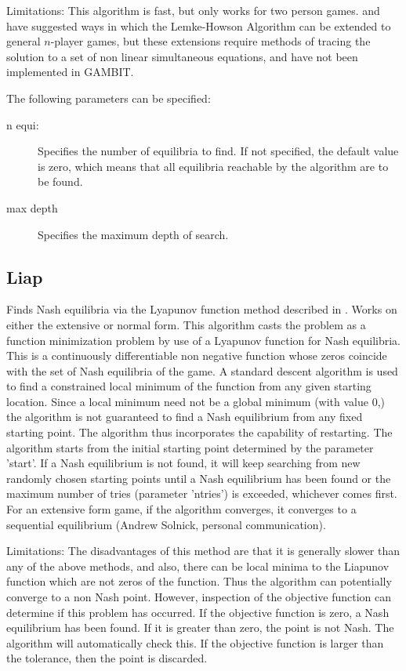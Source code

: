 Limitations:  This algorithm is fast, but only works for two
person games.  \cite{Wilson:1971} and \cite{Rosenmuller:1971} have
suggested ways in which the Lemke-Howson Algorithm can be extended to
general $n$-player games, but these extensions require methods of tracing
the solution to a set of non linear simultaneous equations, and have not
been implemented in GAMBIT.

The following parameters can be specified:

\begin{description}
\item[n equi:] Specifies the number of equilibria to find.  If not specified,
the default value is zero, which means that all equilibria reachable by
the algorithm are to be found.
\item[max depth]
Specifies the maximum depth of search.
\end{description}

\subsection{Liap}\label{Liap}
Finds Nash equilibria via the Lyapunov function method
described in \cite{McK:91}.  Works on either the extensive or normal
form.  This algorithm casts the problem as a function minimization
problem by use of a Lyapunov function for Nash equilibria.  This is a
continuously differentiable non negative function whose zeros coincide
with the set of Nash equilibria of the game.  A standard descent
algorithm is used to find a constrained local minimum of the function
from any given starting location.  Since a local minimum need not be a
global minimum (with value 0,) the algorithm is not guaranteed to find
a Nash equilibrium from any fixed starting point.  The algorithm thus
incorporates the capability of restarting.  The algorithm starts from
the initial starting point determined by the parameter 'start'.  If a
Nash equilibrium is not found, it will keep searching from new
randomly chosen starting points until a Nash equilibrium has been
found or the maximum number of tries (parameter 'ntries') is exceeded,
whichever comes first.  For an extensive form game, if the algorithm
converges, it converges to a sequential equilibrium (Andrew Solnick,
personal communication).

Limitations: The disadvantages of this method are that it is generally
slower than any of the above methods, and also,  there can be local minima
to the Liapunov function which are not zeros of the function.  Thus the
algorithm can potentially converge to a non Nash point.  However,
inspection of the objective function can determine if this problem has
occurred.  If the objective function is zero, a Nash equilibrium has been
found. If it is greater than zero, the point is not Nash.  The algorithm
will automatically check this.  If the objective function is larger than the
tolerance, then the point is discarded.

